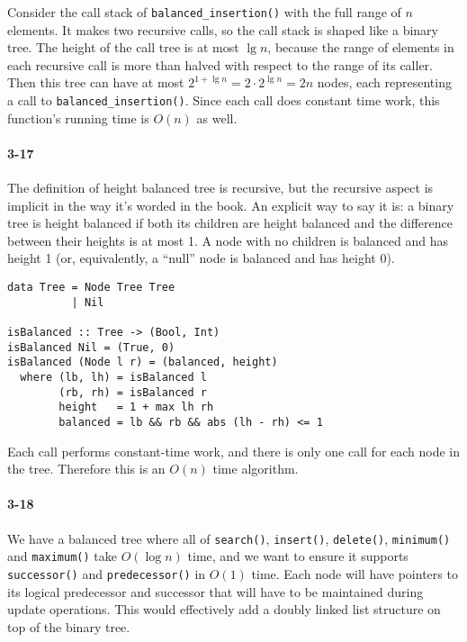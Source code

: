 \documentclass{report}
\begin{document}
Consider the call stack of \lstinline!balanced_insertion()! with the full range of $n$ elements. It makes two recursive calls, so the call stack is shaped like a binary tree. The height of the call tree is at most $\lg n$, because the range of elements in each recursive call is more than halved with respect to the range of its caller. Then this tree can have at most $2^{1+\lg n} = 2\cdot 2^{\lg n} = 2n$ nodes, each representing a call to \lstinline!balanced_insertion()!. Since each call does constant time work, this function's running time is $O(n)$ as well.

\paragraph{3-17} The definition of height balanced tree is recursive, but the recursive aspect is implicit in the way it's worded in the book. An explicit way to say it is: a binary tree is height balanced if both its children are height balanced and the difference between their heights is at most 1. A node with no children is balanced and has height 1 (or, equivalently, a ``null'' node is balanced and has height 0).

\begin{lstlisting}
data Tree = Node Tree Tree
          | Nil

isBalanced :: Tree -> (Bool, Int)
isBalanced Nil = (True, 0)
isBalanced (Node l r) = (balanced, height)
  where (lb, lh) = isBalanced l
        (rb, rh) = isBalanced r
        height   = 1 + max lh rh
        balanced = lb && rb && abs (lh - rh) <= 1
\end{lstlisting}

Each call performs constant-time work, and there is only one call for each node in the tree. Therefore this is an $O(n)$ time algorithm.

\paragraph{3-18} We have a balanced tree where all of \lstinline!search()!, \lstinline!insert()!, \lstinline!delete()!, \lstinline!minimum()! and \lstinline!maximum()! take $O(\log n)$ time, and we want to ensure it supports \lstinline!successor()! and \lstinline!predecessor()! in $O(1)$ time. Each node will have pointers to its logical predecessor and successor that will have to be maintained during update operations. This would effectively add a doubly linked list structure on top of the binary tree.
\end{document}

